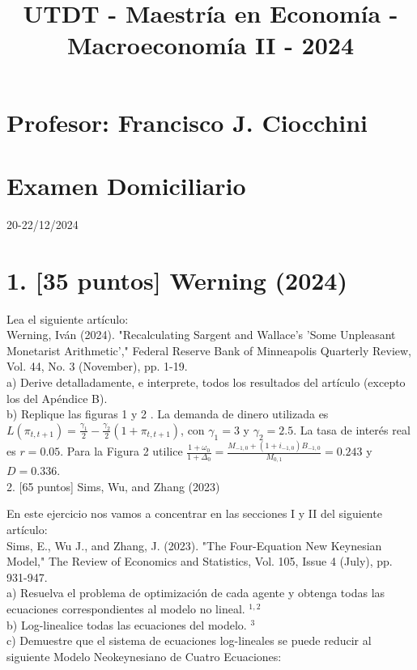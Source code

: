 \documentclass[10pt]{article}
\title{UTDT - Maestría en Economía - Macroeconomía II - 2024 }
\author{}
\date{}
\begin{document}
\maketitle
\section*{Profesor: Francisco J. Ciocchini}
\section*{Examen Domiciliario}
20-22/12/2024

\section*{1. [35 puntos] Werning (2024)}
Lea el siguiente artículo:\\
Werning, Iván (2024). "Recalculating Sargent and Wallace's 'Some Unpleasant Monetarist Arithmetic'," Federal Reserve Bank of Minneapolis Quarterly Review, Vol. 44, No. 3 (November), pp. 1-19.\\
a) Derive detalladamente, e interprete, todos los resultados del artículo (excepto los del Apéndice B).\\
b) Replique las figuras 1 y 2 . La demanda de dinero utilizada es $L\left(\pi_{t, t+1}\right)=\frac{\gamma_{1}}{2}-\frac{\gamma_{2}}{2}\left(1+\pi_{t, t+1}\right)$, con $\gamma_{1}=3$ y $\gamma_{2}=2.5$. La tasa de interés real es $r=0.05$. Para la Figura 2 utilice $\frac{1+\omega_{0}}{1+\Delta_{0}}=\frac{M_{-1,0}+\left(1+i_{-1,0}\right) B_{-1,0}}{M_{0,1}}=0.243$ y $D=0.336$.\\[0pt]

2. [65 puntos] Sims, Wu, and Zhang (2023)

En este ejercicio nos vamos a concentrar en las secciones I y II del siguiente artículo:\\
Sims, E., Wu J., and Zhang, J. (2023). "The Four-Equation New Keynesian Model," The Review of Economics and Statistics, Vol. 105, Issue 4 (July), pp. 931-947.\\
a) Resuelva el problema de optimización de cada agente y obtenga todas las ecuaciones correspondientes al modelo no lineal. ${ }^{1,2}$\\
b) Log-linealice todas las ecuaciones del modelo. ${ }^{3}$\\
c) Demuestre que el sistema de ecuaciones log-lineales se puede reducir al siguiente Modelo Neokeynesiano de Cuatro Ecuaciones:
\end{document}
